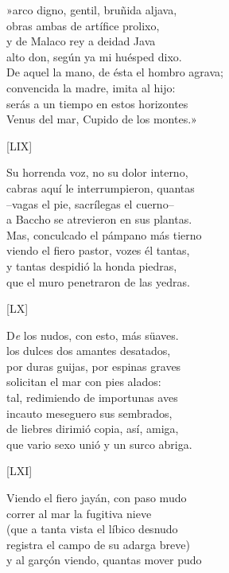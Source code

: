 \documentclass[11pt,a4paper,twoside]{article}
\begin{document}
»arco digno, gentil, bruñida aljava,\\
obras ambas de artífice prolixo,\\
y de Malaco rey a deidad Java\\
alto don, según ya mi huésped dixo.\\
De aquel la mano, de ésta el hombro agrava;\\
convencida la madre, imita al hijo:\\
serás a un tiempo en estos horizontes\\
Venus del mar, Cupido de los montes.»\pend
\begin{center}
	[LIX]
\end{center}\pstart
Su horrenda voz, no su dolor interno,\\
cabras aquí le interrumpieron, quantas\\
--vagas el pie, sacrílegas el cuerno--\\
a Baccho se atrevieron en sus plantas.\\
Mas, conculcado el pámpano más tierno\\
viendo el fiero pastor, vozes él tantas,\\
y tantas despidió la honda piedras,\\
que el muro penetraron de las yedras.\pend
\begin{center}
	[LX]
\end{center}\pstart
D\textit{e} los nudos, con esto, más süaves.\\
los dulces dos amantes desatados,\\
por duras guijas, por espinas graves\\
solicitan el mar con pies alados:\\
tal, redimiendo de importunas aves\\
incauto meseguero sus sembrados,\\
de liebres dirimió copia, así, amiga,\\
que vario sexo unió y un surco abriga.\pend
\begin{center}
	[LXI]
\end{center}\pstart
Viendo el fiero jayán, con paso mudo\\
correr al mar la fugitiva nieve\\
(que a tanta vista el líbico desnudo\\
registra el campo de su adarga breve)\\
y al garçón viendo, quantas mover pudo\\
\end{document}
